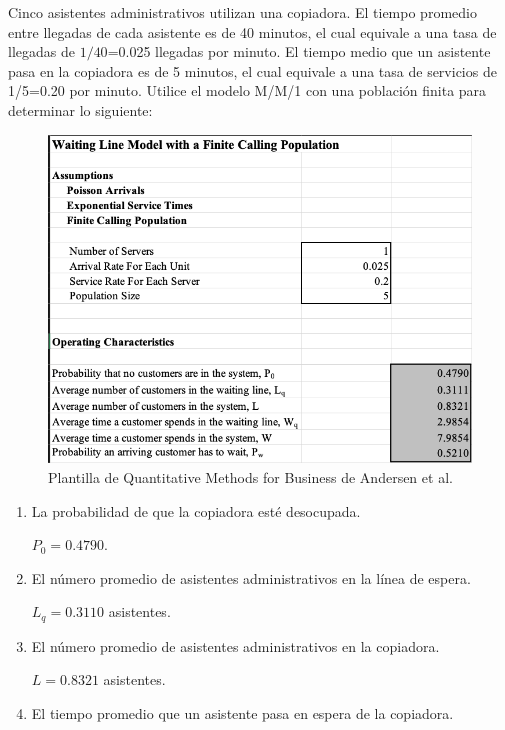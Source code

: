 \begin{problema}
	Cinco asistentes administrativos utilizan una copiadora. El tiempo promedio entre llegadas de cada asistente es de 40 minutos, el cual equivale a una tasa de llegadas de $1/40$=0.025 llegadas por minuto. El tiempo medio que un asistente pasa en la copiadora es de 5 minutos, el cual equivale a una tasa de servicios de 1/5=0.20 por minuto. Utilice el modelo M/M/1 con una población finita para determinar lo siguiente:
	\begin{figure}[H]
		\centering
		\includegraphics[scale=0.4]{Images/8}
		\caption{Plantilla de Quantitative Methods for Business de Andersen et al. }
	\end{figure}
	\begin{enumerate}
		\item La probabilidad de que la copiadora esté desocupada.
		\begin{sol}
			$P_0=0.4790$. 
		\end{sol}
		\item El número promedio de asistentes administrativos en la línea de espera.
		\begin{sol}
			$L_q=0.3110$ asistentes.
		\end{sol}
		\item El número promedio de asistentes administrativos en la copiadora.
		\begin{sol}
			$L=0.8321$ asistentes. 
		\end{sol}
		\item El tiempo promedio que un asistente pasa en espera de la copiadora.
		\begin{sol}

\end{sol}
\end{enumerate}
\end{problema}
